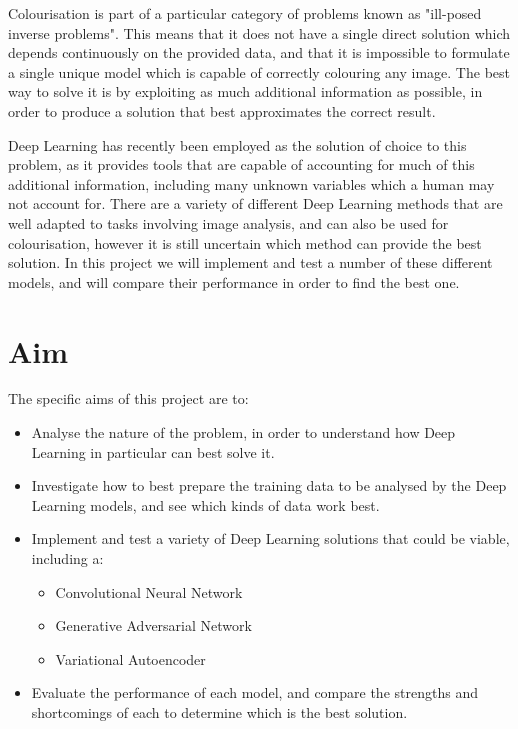 \documentclass{l4proj}
\begin{document}
Colourisation is part of a particular category of problems known as "ill-posed inverse problems". This means that it does not have a single direct solution which depends continuously on the provided data, and that it is impossible to formulate a single unique model which is capable of correctly colouring any image. The best way to solve it is by exploiting as much additional information as possible, in order to produce a solution that best approximates the correct result. 

Deep Learning has recently been employed as the solution of choice to this problem, as it provides tools that are capable of accounting for much of this additional information, including many unknown variables which a human may not account for. There are a variety of different Deep Learning methods that are well adapted to tasks involving image analysis, and can also be used for colourisation, however it is still uncertain which method can provide the best solution. In this project we will implement and test a number of these different models, and will compare their performance in order to find the best one.

\section{Aim}

The specific aims of this project are to:
\begin{itemize}
    \item Analyse the nature of the problem, in order to understand how Deep Learning in particular can best solve it.
    \item Investigate how to best prepare the training data to be analysed by the Deep Learning models, and see which kinds of data work best.
    \item Implement and test a variety of Deep Learning solutions that could be viable, including a:
    \begin{itemize}
      \item Convolutional Neural Network
      \item Generative Adversarial Network
      \item Variational Autoencoder
    \end{itemize}
    \item Evaluate the performance of each model, and compare the strengths and shortcomings of each to determine which is the best solution.
\end{itemize}
\end{document}
